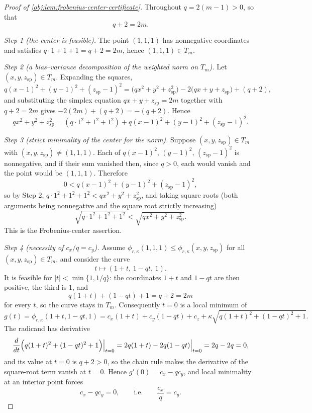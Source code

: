 \documentclass[11pt]{article}
\begin{document}
\begin{proof}[Proof of \cref{obj:lem:frobenius-center-certificate}]
Throughout \(q=2(m-1)>0\), so that
\[
q+2=2m .
\]

\emph{Step 1 (the center is feasible).}  The point \((1,1,1)\) has nonnegative coordinates and satisfies \(q\cdot1+1+1=q+2=2m\), hence \((1,1,1)\in T_m\). %

\emph{Step 2 (a bias--variance decomposition of the weighted norm on \(T_m\)).}  Let \((x,y,z_{\mathrm{sp}})\in T_m\).  Expanding the squares,
\[
q(x-1)^2+(y-1)^2+(z_{\mathrm{sp}}-1)^2
=\bigl(qx^2+y^2+z_{\mathrm{sp}}^2\bigr)
-2\bigl(qx+y+z_{\mathrm{sp}}\bigr)+(q+2),
\]
and substituting the simplex equation \(qx+y+z_{\mathrm{sp}}=2m\) together with \(q+2=2m\) gives \(-2(2m)+(q+2)=-(q+2)\).  Hence
\[
qx^2+y^2+z_{\mathrm{sp}}^2
=(q\cdot1^2+1^2+1^2)+q(x-1)^2+(y-1)^2+(z_{\mathrm{sp}}-1)^2 .
\]

\emph{Step 3 (strict minimality of the center for the norm).}  Suppose \((x,y,z_{\mathrm{sp}})\in T_m\) with \((x,y,z_{\mathrm{sp}})\ne(1,1,1)\).  Each of \(q(x-1)^2\), \((y-1)^2\), \((z_{\mathrm{sp}}-1)^2\) is nonnegative, and if their sum vanished then, since \(q>0\), each would vanish and the point would be \((1,1,1)\).  Therefore
\[
0<q(x-1)^2+(y-1)^2+(z_{\mathrm{sp}}-1)^2 ,
\]
so by Step 2, \(q\cdot1^2+1^2+1^2<qx^2+y^2+z_{\mathrm{sp}}^2\), and taking square roots (both arguments being nonnegative and the square root strictly increasing)
\[
\sqrt{q\cdot1^2+1^2+1^2}<\sqrt{qx^2+y^2+z_{\mathrm{sp}}^2}.
\]
This is the Frobenius-center assertion. %

\emph{Step 4 (necessity of \(c_x/q=c_y\)).}  Assume \(\phi_{r,\kappa}(1,1,1)\le\phi_{r,\kappa}(x,y,z_{\mathrm{sp}})\) for all \((x,y,z_{\mathrm{sp}})\in T_m\), and consider the curve
\[
t\longmapsto(1+t,\,1-qt,\,1).
\]
It is feasible for \(|t|<\min\{1,1/q\}\): the coordinates \(1+t\) and \(1-qt\) are then positive, the third is \(1\), and
\[
q(1+t)+(1-qt)+1=q+2=2m
\]
for every \(t\), so the curve stays in \(T_m\).  Consequently \(t=0\) is a local minimum of
\[
g(t)=\phi_{r,\kappa}(1+t,1-qt,1)
=c_x(1+t)+c_y(1-qt)+c_z
+\kappa\sqrt{q(1+t)^2+(1-qt)^2+1}.
\]
The radicand has derivative
\[
\frac{d}{dt}\Bigl(q(1+t)^2+(1-qt)^2+1\Bigr)\Big|_{t=0}
=2q(1+t)-2q(1-qt)\Big|_{t=0}=2q-2q=0,
\]
and its value at \(t=0\) is \(q+2>0\), so the chain rule makes the derivative of the square-root term vanish at \(t=0\).  Hence \(g'(0)=c_x-qc_y\), and local minimality at an interior point forces
\[
c_x-qc_y=0,
\qquad\text{i.e.}\qquad
\frac{c_x}{q}=c_y .
\]


\end{proof}
\end{document}
